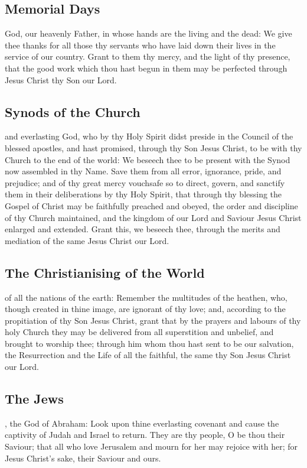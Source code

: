 \subsection{Memorial Days}
 God, our heavenly Father, in whose hands are the living and the dead: We give thee thanks for all those thy servants who have laid down their lives in the service of our country. Grant to them thy mercy, and the light of thy presence, that the good work which thou hast begun in them may be perfected through Jesus Christ thy Son our Lord.

\subsection{Synods of the Church}
 and everlasting God, who by thy Holy Spirit didst preside in the Council of the blessed apostles, and hast promised, through thy Son Jesus Christ, to be with thy Church to the end of the world: We beseech thee to be present with the Synod now  assembled in thy Name. Save them from all error, ignorance, pride, and prejudice; and of thy great mercy vouchsafe so to direct, govern, and sanctify them in their deliberations by thy Holy Spirit, that through thy blessing the Gospel of Christ may be faithfully preached and obeyed, the order and discipline of thy Church maintained, and the kingdom of our Lord and Saviour Jesus Christ enlarged and extended. Grant this, we beseech thee, through the merits and mediation of the same Jesus Christ our Lord.

\subsection{The Christianising of the World}
 of all the nations of the earth: Remember the multitudes of the heathen, who, though created in thine image, are ignorant of thy love; and, according to the propitiation of thy Son Jesus Christ, grant that by the prayers and labours of thy holy Church they may be delivered from all superstition and unbelief, and brought to worship thee; through him whom thou hast sent to be our salvation, the Resurrection and the Life of all the faithful, the same thy Son Jesus Christ our Lord.

\subsection{The Jews}
, the God of Abraham: Look upon thine everlasting covenant and cause the captivity of Judah and Israel to return. They are thy people, O be thou their Saviour; that all who love Jerusalem and mourn for her may rejoice with her; for Jesus Christ's sake, their Saviour and ours.


